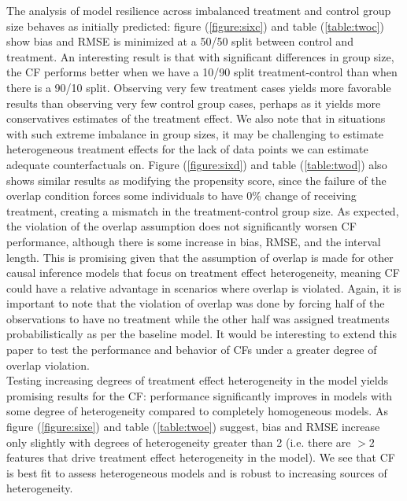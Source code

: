 \documentclass[12pt]{article}
\begin{document}
The analysis of model resilience across imbalanced treatment and control group
size behaves as initially predicted: figure (\ref{figure:sixc}) and table
(\ref{table:twoc}) show bias and RMSE is minimized at a 50/50 split between
control and treatment. An interesting result is that with significant
differences in group size, the CF performs better when we have a 10/90 split
treatment-control than when there is a 90/10 split. Observing very few treatment
cases yields more favorable results than observing very few control group cases,
perhaps as it yields more conservatives estimates of the treatment effect. We
also note that in situations with such extreme imbalance in group sizes, it may
be challenging to estimate heterogeneous treatment effects for the lack of data
points we can estimate adequate counterfactuals on. Figure (\ref{figure:sixd})
and table (\ref{table:twod}) also shows similar results as modifying the
propensity score, since the failure of the overlap condition forces some
individuals to have 0\% change of receiving treatment, creating a mismatch in
the treatment-control group size. As expected, the violation of the overlap assumption does not significantly
worsen CF performance, although there is some increase in bias, RMSE, and the
interval length. This is promising given that the assumption of overlap is made
for other causal inference models that focus on treatment effect heterogeneity,
meaning CF could have a relative advantage in scenarios where overlap is
violated. Again, it is important to note that the violation of overlap was done
by forcing half of the observations to have no treatment while the other half
was assigned treatments probabilistically as per the baseline model. It would be
interesting to extend this paper to test the performance and behavior of CFs under a greater
degree of overlap violation.\\ 

Testing increasing degrees of treatment effect heterogeneity in the model yields
promising results for the CF: performance significantly improves in models with
some degree of heterogeneity compared to completely homogeneous models. As
figure (\ref{figure:sixe}) and table (\ref{table:twoe}) suggest, bias and RMSE
increase only slightly with degrees of heterogeneity greater than 2 (i.e. there are
$>2$ features that drive treatment effect heterogeneity in the model). We see
that CF is best fit to assess heterogeneous models and is robust to increasing
sources of heterogeneity. \\ 
\end{document}
